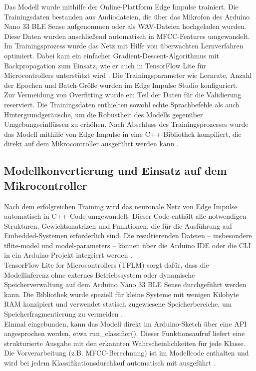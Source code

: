 Das Modell wurde mithilfe der Online-Plattform Edge Impulse trainiert. Die Trainingsdaten bestanden aus Audiodateien, die über das Mikrofon des Arduino Nano 33 BLE Sense aufgenommen oder als WAV-Dateien hochgeladen wurden. Diese Daten wurden anschließend automatisch in MFCC-Features umgewandelt.\\
\bigskip
Im Trainingsprozess wurde das Netz mit Hilfe von überwachten Lernverfahren optimiert. Dabei kam ein einfacher Gradient-Descent-Algorithmus mit Backpropagation zum Einsatz, wie er auch in TensorFlow Lite für Microcontrollers unterstützt wird \cite{TensorFlow:2025LiteMicrocontrollers}. Die Trainingsparameter wie Lernrate, Anzahl der Epochen und Batch-Größe wurden im Edge Impulse Studio konfiguriert.\\
\bigskip
Zur Vermeidung von Overfitting wurde ein Teil der Daten für die Validierung reserviert. Die Trainingsdaten enthielten sowohl echte Sprachbefehle als auch Hintergrundgeräusche, um die Robustheit des Modells gegenüber Umgebungseinflüssen zu erhöhen. Nach Abschluss des Trainingsprozesses wurde das Modell mithilfe von Edge Impulse in eine C++-Bibliothek kompiliert, die direkt auf dem Mikrocontroller ausgeführt werden kann \cite{EdgeImpulseClassification:2025} \cite{EdgeImpulseDeployment:2025}.

\subsection{Modellkonvertierung und Einsatz auf dem Mikrocontroller} \label{sec:Modellkonvertierung und Einsatz auf dem Mikrocontroller}

Nach dem erfolgreichen Training wird das neuronale Netz von Edge Impulse automatisch in C++-Code umgewandelt. Dieser Code enthält alle notwendigen Strukturen, Gewichtsmatrizen und Funktionen, die für die Ausführung auf Embedded-Systemen erforderlich sind. Die resultierenden Dateien – insbesondere tflite-model und model-parameters – können über die Arduino IDE oder die CLI in ein Arduino-Projekt integriert werden \cite{EdgeImpulseDeployment:2025}.\\
\bigskip
TensorFlow Lite for Microcontrollers (TFLM) sorgt dafür, dass die Modellinferenz ohne externes Betriebssystem oder dynamische Speicherverwaltung auf dem Arduino Nano 33 BLE Sense durchgeführt werden kann. Die Bibliothek wurde speziell für kleine Systeme mit wenigen Kilobyte RAM konzipiert und verwendet statisch zugewiesene Speicherbereiche, um Speicherfragmentierung zu vermeiden \cite{TensorFlow:2025LiteMicrocontrollers}.\\
\bigskip
Einmal eingebunden, kann das Modell direkt im Arduino-Sketch über eine API angesprochen werden, etwa run\_classifier(). Dieser Funktionsaufruf liefert eine strukturierte Ausgabe mit den erkannten Wahrscheinlichkeiten für jede Klasse. Die Vorverarbeitung (z.B. MFCC-Berechnung) ist im Modellcode enthalten und wird bei jedem Klassifikationsdurchlauf automatisch mit ausgeführt \cite{TensorFlow:2025LiteMicrocontrollers}.


